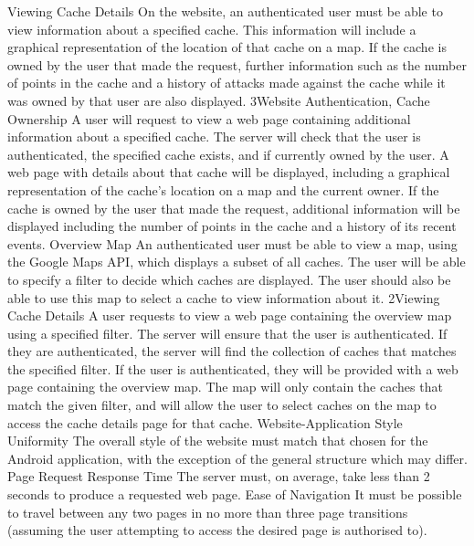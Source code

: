 			{Viewing Cache Details}
			{On the website, an authenticated user must be able to view
			information about a specified cache. This information will include
			a graphical representation of the location of that cache on a map.
			If the cache is owned by the user that made the request, further
			information such as the number of points in the cache and a history 
			of attacks made against the cache while it was owned by that user
			are also displayed.}
			{3}{Website Authentication, Cache Ownership}
			{A user will request to view a web page containing additional
			information about a specified cache.}
			{The server will check that the user is authenticated, the
			specified cache	exists, and if currently owned by the user.}
			{A web page with details about that cache will be displayed,
			including a graphical representation of the cache's location on a
			map and the current owner. If the cache is owned by the user that
			made the request, additional information will be displayed
			including the number of points in the cache and a history of its
			recent events.}
		\funcreq %
			{Overview Map}
			{An authenticated user must be able to view a map, using the Google
			Maps API, which displays a subset of all caches. The user will be
			able to specify a filter to decide which caches are displayed. The
			user should also be able to use this map to select a cache to view
			information about it.}
			{2}{Viewing Cache Details}
			{A user requests to view a web page containing the overview map
			using a specified filter.}
			{The server will ensure that the user is authenticated. If they are
			authenticated, the server will find the collection of caches that
			matches the specified filter.}
			{If the user is authenticated, they will be provided with a web 
			page containing the overview map. The map will only contain the
			caches that match the given filter, and will allow the user to
			select caches on the map to access the cache details page for that
			cache.}
		\nonfuncreq %
			{Website-Application Style Uniformity}
			{The overall style of the website must match that chosen for the
			Android application, with the exception of the general structure
			which may differ.}
		\nonfuncreq %
			{Page Request Response Time}
			{The server must, on average, take less than 2 seconds to produce
			a requested web page.}
		\nonfuncreq %
			{Ease of Navigation}
			{It must be possible to travel between any two pages in no more
			than three page transitions (assuming the user attempting to
			access the desired page is authorised to).}

\renewcommand{\arraystretch}{1}
